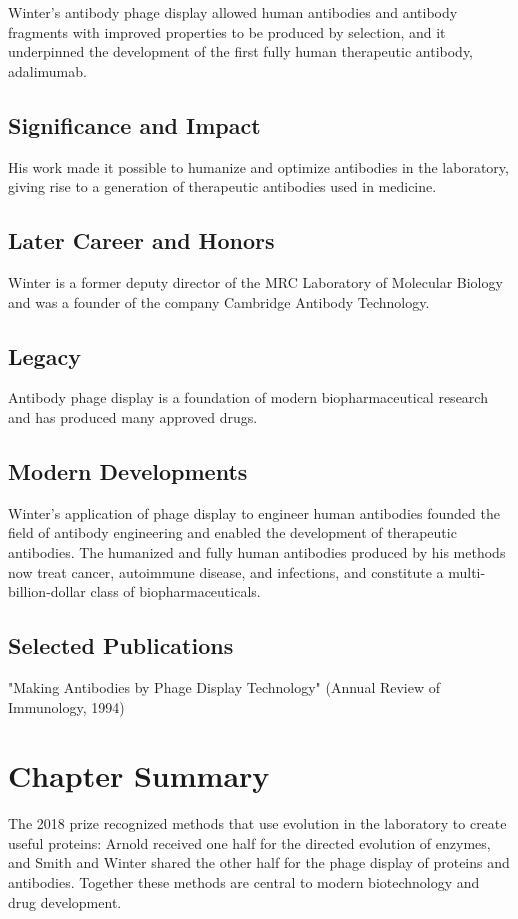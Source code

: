 Winter's antibody phage display allowed human antibodies and antibody fragments with improved properties to be produced by selection, and it underpinned the development of the first fully human therapeutic antibody, adalimumab.

\subsection*{Significance and Impact}

His work made it possible to humanize and optimize antibodies in the laboratory, giving rise to a generation of therapeutic antibodies used in medicine.

\subsection*{Later Career and Honors}

Winter is a former deputy director of the MRC Laboratory of Molecular Biology and was a founder of the company Cambridge Antibody Technology.

\subsection*{Legacy}

Antibody phage display is a foundation of modern biopharmaceutical research and has produced many approved drugs.

\subsection*{Modern Developments}

Winter's application of phage display to engineer human antibodies founded the field of antibody engineering and enabled the development of therapeutic antibodies. The humanized and fully human antibodies produced by his methods now treat cancer, autoimmune disease, and infections, and constitute a multi-billion-dollar class of biopharmaceuticals.

\subsection*{Selected Publications}

"Making Antibodies by Phage Display Technology" (Annual Review of Immunology, 1994)

\clearpage

\section*{Chapter Summary}

The 2018 prize recognized methods that use evolution in the laboratory to create useful proteins: Arnold received one half for the directed evolution of enzymes, and Smith and Winter shared the other half for the phage display of proteins and antibodies. Together these methods are central to modern biotechnology and drug development.
